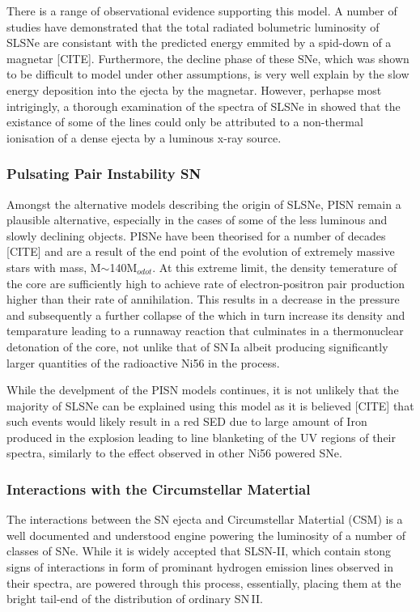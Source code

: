 There is a range of observational evidence supporting this model. A number of studies have demonstrated that the total radiated bolumetric luminosity of SLSNe are consistant with the predicted energy emmited by a spid-down of a magnetar [CITE]. Furthermore, the decline phase of these SNe, which was shown to be difficult to model under other assumptions, is very well explain by the slow energy deposition into the ejecta by the magnetar. However, perhapse most intrigingly, a thorough examination of the spectra of SLSNe in \citet{Mazzali2015} showed that the existance of some of the lines could only be attributed to a non-thermal ionisation of a dense ejecta by a luminous x-ray source.

\subsubsection{Pulsating Pair Instability SN}
Amongst the alternative models describing the origin of SLSNe, PISN remain a plausible alternative, especially in the cases of some of the less luminous and slowly declining objects. PISNe have been theorised for a number of decades [CITE] and are a result of the end point of the evolution of extremely massive stars with mass, M$\sim$140M$_{odot}$. At this extreme limit, the density temerature of the core are sufficiently high to achieve rate of electron-positron pair production higher than their rate of annihilation. This results in a decrease in the pressure and subsequently a further collapse of the which in turn increase its density and temparature leading to a runnaway reaction that culminates in a thermonuclear detonation of the core, not unlike that of SN\,Ia albeit producing significantly larger quantities of the radioactive Ni56 in the process.

While the develpment of the PISN models continues, it is not unlikely that the majority of SLSNe can be explained using this model as it is believed [CITE] that such events would likely result in a red SED due to large amount of Iron produced in the explosion leading to line blanketing of the UV regions of their spectra, similarly to the effect observed in other Ni56 powered SNe.

\subsubsection{Interactions with the Circumstellar Matertial}
The interactions between the SN ejecta and Circumstellar Matertial (CSM) is a well documented and understood engine powering the luminosity of a number of classes of SNe. While it is widely accepted that SLSN-II, which contain stong signs of interactions in form of prominant hydrogen emission lines observed in their spectra, are powered through this process, essentially, placing them at the bright tail-end of the distribution of ordinary SN\,II.

